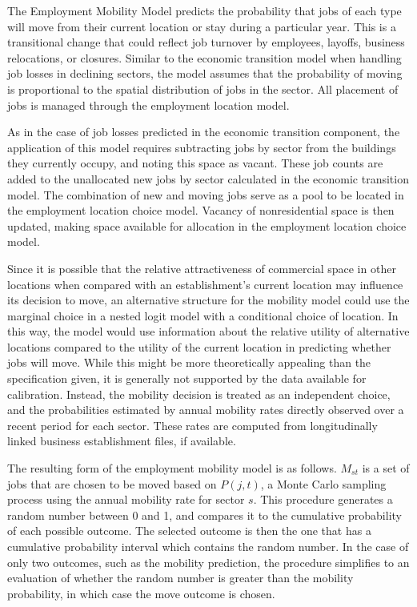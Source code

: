 \documentclass[fleqn]{article}
\begin{document}
The Employment Mobility Model predicts the probability that jobs
of each type will move from their current location or stay during
a particular year. This is a transitional change that could
reflect job turnover by employees, layoffs, business relocations,
or closures. Similar to the economic transition model when
handling job losses in declining sectors, the model assumes that
the probability of moving is proportional to the spatial distribution
of jobs in the sector.  All placement of jobs is managed through
the employment location model.

As in the case of job losses predicted in the economic transition
component, the application of this model requires subtracting jobs
by sector from the buildings they currently occupy, and noting
this space as vacant.  These job counts are added to the
unallocated new jobs by sector calculated in the economic
transition model. The combination of new and moving jobs serve as
a pool to be located in the employment location choice model.
Vacancy of nonresidential space is then updated, making space
available for allocation in the employment location choice model.

Since it is possible that the relative attractiveness of
commercial space in other locations when compared with an
establishment's current location may influence its decision to
move, an alternative structure for the mobility model could use
the marginal choice in a nested logit model with a conditional
choice of location. In this way, the model would use information
about the relative utility of alternative locations compared to
the utility of the current location in predicting whether jobs
will move.  While this might be more theoretically appealing than
the specification given, it is generally not supported by the data
available for calibration. Instead, the mobility decision is
treated as an independent choice, and the probabilities estimated
by annual mobility rates directly observed over a recent period
for each sector.  These rates are computed from longitudinally
linked business establishment files, if available.

The resulting form of the employment mobility model is as follows.
$M_{st}$ is a set of jobs that are chosen to be moved based on
$P(j, t)$, a Monte Carlo sampling process using the annual
mobility rate for sector $s$.  This procedure generates a random
number between 0 and 1, and compares it to the cumulative
probability of each possible outcome.  The selected outcome is
then the one that has a cumulative probability interval which
contains the random number.  In the case of only two outcomes,
such as the mobility prediction, the procedure simplifies to an
evaluation of whether the random number is greater than the
mobility probability, in which case the move outcome is chosen.
\end{document}
